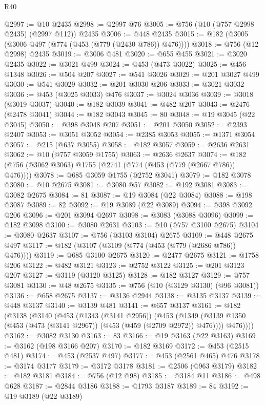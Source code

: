 \begin{lexlean}{R40}
\begin{coremodule}
@2997 := @10 @2435
@2998 := @2997 @76
@3005 := @756 (@10 (@757 @2998 @2435) (@2997 @112)) @2435
@3006 := @448 @2435
@3015 := @182 (@3005 (@3006 @497 (@774 (@453 (@779 (@2430 @786)) @476))))
@3018 := @756 (@12 @2998) @2435
@3019 := @3006 @481
@3020 := @655 @455
@3021 := @3020 @2435
@3022 := @3021 @499
@3024 := @453 (@473 @3022)
@3025 := @456 @1348
@3026 := @504 @207
@3027 := @541 @3026
@3029 := @201 @3027 @499
@3030 := @541 @3029
@3032 := @201 @3030 @206
@3033 := @3021 @3032
@3036 := @453 (@3025 @3033) @476
@3037 := @3024 @3036
@3039 := @3018 (@3019 @3037)
@3040 := @182 @3039
@3041 := @482 @207
@3043 := @2476 (@2478 @3041)
@3044 := @182 @3043
@3045 := 80
@3048 := @19 @3045 (@22 @3045)
@3050 := @398 @3048 @207
@3051 := @201 @3050
@3052 := @2393 @2407
@3053 := @3051 @3052
@3054 := @2385 @3053
@3055 := @1371 @3054
@3057 := @215 (@637 @3055)
@3058 := @182 @3057
@3059 := @2636 @2631
@3062 := @10 (@757 @3059 @1755)
@3063 := @2636 @2637
@3074 := @182 (@756 (@3062 @3063) @1755 (@2741 (@774 (@453 (@779 (@2667 @786)) @476))))
@3078 := @685 @3059 @1755 (@2752 @3041)
@3079 := @182 @3078
@3080 := @10 @2675
@3081 := @3080 @57
@3082 := @192 @3081
@3083 := @3082 @2675
@3084 := 81
@3087 := @19 @3084 (@22 @3084)
@3088 := @198 @3087
@3089 := 82
@3092 := @19 @3089 (@22 @3089)
@3094 := @398 @3092 @206
@3096 := @201 @3094 @2697
@3098 := @3083 (@3088 @3096)
@3099 := @182 @3098
@3100 := @3080 @2631
@3103 := @10 (@757 @3100 @2675)
@3104 := @3080 @2637
@3107 := @756 (@3103 @3104) @2675
@3109 := @448 @2675 @497
@3117 := @182 (@3107 (@3109 (@774 (@453 (@779 (@2686 @786)) @476))))
@3119 := @685 @3100 @2675
@3120 := @2477 @2675
@3121 := @1758 @206
@3122 := @482 @3121
@3123 := @2752 @3122
@3125 := @201 @3123 @207
@3127 := @3119 (@3120 @3125)
@3128 := @182 @3127
@3129 := @757 @3081
@3130 := @48 @2675
@3135 := @756 (@10 (@3129 @3130) (@96 @3081))
@3136 := @658 @2675
@3137 := @3136 @2944
@3138 := @3135 @3137
@3139 := @448 @3137
@3140 := @3139 @481
@3141 := @657 @3137
@3161 := @182
    (@3138
      (@3140
        (@453
          (@1343 (@3141 @2956))
          (@453
            (@1349 (@3139 @1350 (@453 (@473 (@3141 @2967)) (@453 (@459 (@2709 @2972)) @476))))
            @476))))
@3162 := @3082 @3130
@3163 := 83
@3166 := @19 @3163 (@22 @3163)
@3169 := @3162 (@198 @3166 @207)
@3170 := @182 @3169
@3172 := @453 (@2515 @481)
@3174 := @453 (@2537 @497)
@3177 := @453 (@2561 @465) @476
@3178 := @3174 @3177
@3179 := @3172 @3178
@3181 := @2506 (@963 @3179)
@3182 := @182 @3181
@3184 := @756 (@12 @98)
@3185 := @3184 @11
@3186 := @498 @628
@3187 := @2844 @3186
@3188 := @1793 @3187
@3189 := 84
@3192 := @19 @3189 (@22 @3189)

\end{coremodule}
\end{lexlean}
